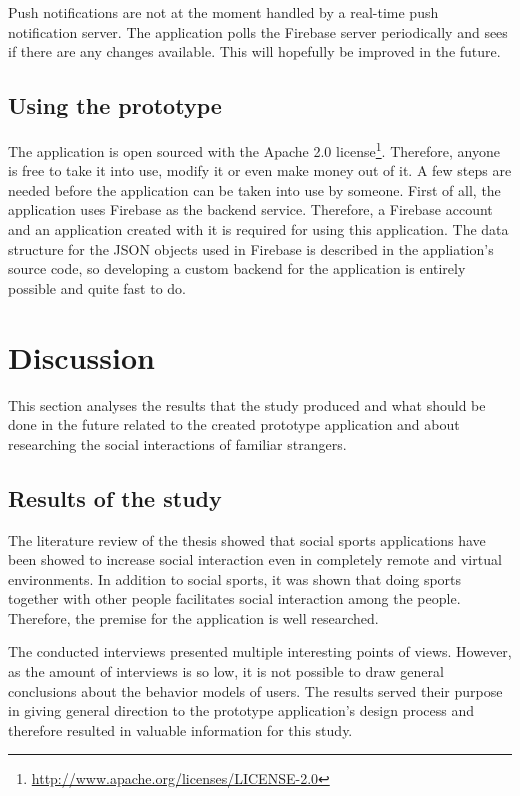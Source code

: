 Push notifications are not at the moment handled by a real-time push notification server. The application polls the Firebase server periodically and sees if there are any changes available. This will hopefully be improved in the future.

\subsection{Using the prototype}

The application is open sourced with the Apache 2.0 license\footnote{\url{http://www.apache.org/licenses/LICENSE-2.0}}. Therefore, anyone is free to take it into use, modify it or even make money out of it. A few steps are needed before the application can be taken into use by someone. First of all, the application uses Firebase as the backend service. Therefore, a Firebase account and an application created with it is required for using this application. The data structure for the JSON objects used in Firebase is described in the appliation's source code, so developing a custom backend for the application is entirely possible and quite fast to do.
\clearpage
\section{Discussion}

This section analyses the results that the study produced and what should be done in the future related to the created prototype application and about researching the social interactions of familiar strangers.

\subsection{Results of the study}

The literature review of the thesis showed that social sports applications have been showed to increase social interaction even in completely remote and virtual environments. In addition to social sports, it was shown that doing sports together with other people facilitates social interaction among the people. Therefore, the premise for the application  is well researched.

The conducted interviews presented multiple interesting points of views. However, as the amount of interviews is so low, it is not possible to draw general conclusions about the behavior models of users. The results served their purpose in giving general direction to the prototype application's design process and therefore resulted in valuable information for this study.

